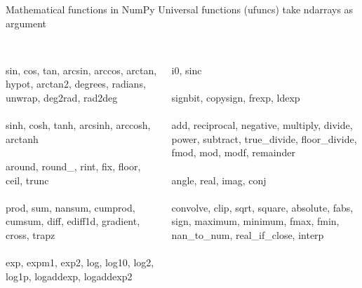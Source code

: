 \documentclass[svgnames]{beamer}
\begin{document}
\begin{frame}{Mathematical functions in NumPy}
 \hspace*{-0.45truecm} Universal functions (ufuncs) take ndarrays as argument

 \vspace{0.4truecm}
 \begin{columns}[t]
  \begin{column}{0.5\textwidth}
   \begin{scriptsize}%
    \\
     {\tiny sin, cos, tan, arcsin, arccos, arctan, hypot, arctan2, degrees,
      radians, unwrap, deg2rad, rad2deg}\\[0.2truecm]
   \\
     {\tiny sinh, cosh, tanh, arcsinh, arccosh, arctanh}\\[0.2truecm]
   \\
     {\tiny around, round\_, rint, fix, floor, ceil, trunc}\\[0.2truecm]
   \\
     {\tiny prod, sum, nansum, cumprod, cumsum, diff, ediff1d,
      gradient, cross, trapz}\\[0.2truecm]
   \\
     {\tiny exp, expm1, exp2, log, log10, log2, log1p, logaddexp,
      logaddexp2}\\[0.2truecm]
   \end{scriptsize}
  \end{column}%
  \begin{column}{0.5\textwidth}
   \begin{scriptsize}%
    \\
     {\tiny i0, sinc}\\[0.2truecm]
    \\
     {\tiny signbit, copysign, frexp, ldexp}\\[0.2truecm]
    \\
     {\tiny add, reciprocal, negative, multiply, divide, power, subtract,
      true\_divide, floor\_divide, fmod, mod, modf, remainder}\\[0.2truecm]
    \\
     {\tiny angle, real, imag, conj}\\[0.2truecm]
    \\
     {\tiny convolve, clip, sqrt, square, absolute, fabs, sign, maximum,
      minimum, fmax, fmin, nan\_to\_num, real\_if\_close, interp}\\
   \end{scriptsize}
  \end{column}
 \end{columns}

 \vspace{0.5truecm}
 \hspace*{-0.32truecm}{\small Many more special functions are provided as ufuncs by SciPy}
\end{frame}
\end{document}
